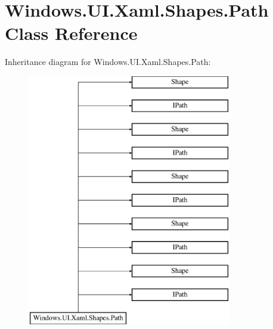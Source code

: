 \hypertarget{class_windows_1_1_u_i_1_1_xaml_1_1_shapes_1_1_path}{}\section{Windows.\+U\+I.\+Xaml.\+Shapes.\+Path Class Reference}
\label{class_windows_1_1_u_i_1_1_xaml_1_1_shapes_1_1_path}
Inheritance diagram for Windows.\+U\+I.\+Xaml.\+Shapes.\+Path\+:\begin{figure}[H]
\begin{center}
\leavevmode
\includegraphics[height=11.000000cm]{class_windows_1_1_u_i_1_1_xaml_1_1_shapes_1_1_path}
\end{center}
\end{figure}
